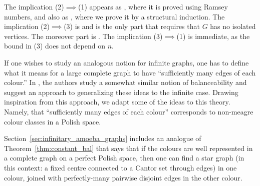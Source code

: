 The implication (2)$\implies$(1) appears as \cite[Theorem~3.6]{caro2022evolution}, where it is proved using Ramsey numbers, and also as \cite[Theorem~1.1]{Caroetal2023}, where we prove it by a structural induction.
The implication (2)$\implies$(3) is \cite[Theorem~3.7]{Caroetal2023} and is the only part that requires that $G$ has no isolated vertices.
The moreover part is \cite[Theorem~5.1]{Caroetal2023}.
The implication (3)$\implies$(1) is immediate, as the bound in (3) does not depend on $n$.

If one wishes to study an analogous notion for infinite graphs, one has to define what it means for a large complete graph to have ``sufficiently many edges of each colour.''
In \cite[Section~4]{bowen2020unavoidable}, the authors study a somewhat similar notion of balanceability and suggest an approach to generalizing these ideas to the infinite case.
Drawing inspiration from this approach, we adapt some of the ideas to this theory.
Namely, that ``sufficiently many edges of each colour'' corresponds to non-meagre colour classes in a Polish space.

Section~\ref{sec:infinitary_amoeba_graphs} includes an analogue of Theorem~\ref{thm:constant_bal} that says that if the colours are well represented in a complete graph on a perfect Polish space, then one can find a star graph (in this context: a fixed centre connected to a Cantor set through edges) in one colour, joined with perfectly-many pairwise disjoint edges in the other colour.
